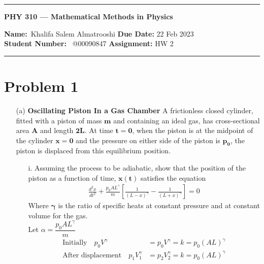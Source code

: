 \documentclass[]{article}
\title{}
\date{}
\newcommand{\bd}{\textbf}
\begin{document}
	\maketitle
	\begin{center}
		\hrule
		\vspace{.4cm}
		{\textbf { \large PHY 310 --- Mathematical Methods in Physics}}
	\end{center}
	{\bd{Name:}\ Khalifa Salem Almatrooshi \hspace{\fill} \bd{Due Date:} 22 Feb 2023 \\
		{ \bd{Student Number:}} \ @00090847 \hspace{\fill} \bd{Assignment:} HW 2 \\
		\hrule
		
		
	\section*{Problem 1}
	\begin{enumerate}
		\item[(a)] \bd{Oscillating Piston In a Gas Chamber} A frictionless closed cylinder, fitted with a piston of mass $\bm{m}$ and containing an ideal gas, has cross-sectional area $\bm{A}$ and length $\bm{2L}$. At time $\bm{t = 0}$, when the piston is at the midpoint of the cylinder $\bm{x=0}$ and the pressure on either side of the piston is $\bm{p_0}$, the piston is displaced from this equilibrium position.
			\begin{enumerate}
				\item[i.] Assuming the process to be adiabatic, show that the position of the piston as a function of time, $\bm{x(t)}$ satisfies the
				equation
				\begin{equation*}
					\begin{split}
						\frac{d^2 x}{dt^2} + \frac{p_0 A L^{\gamma}}{m} \left[ \frac{1}{(L - x)^{\gamma}} - \frac{1}{(L + x)^{\gamma}} \right] = 0
					\end{split}
				\end{equation*}
				Where $\bm{\gamma}$ is the ratio of specific heats at constant pressure and at constant volume for the gas. \\
				Let $\alpha = \dfrac{p_0 A L^{\gamma}}{m}$
					\begin{equation*}
						\begin{split}
							\text{Initially} \quad p_0 V^{\gamma} &= p_0 V^{\gamma} = k = p_0(AL)^{\gamma} \\
							\text{After displacement} \quad p_1 V^{\gamma}_1 &= p_2 V^{\gamma}_2 = k = p_0(AL)^{\gamma} \\

\end{split}
\end{equation*}
\end{enumerate}
\end{enumerate}}
\end{document}
